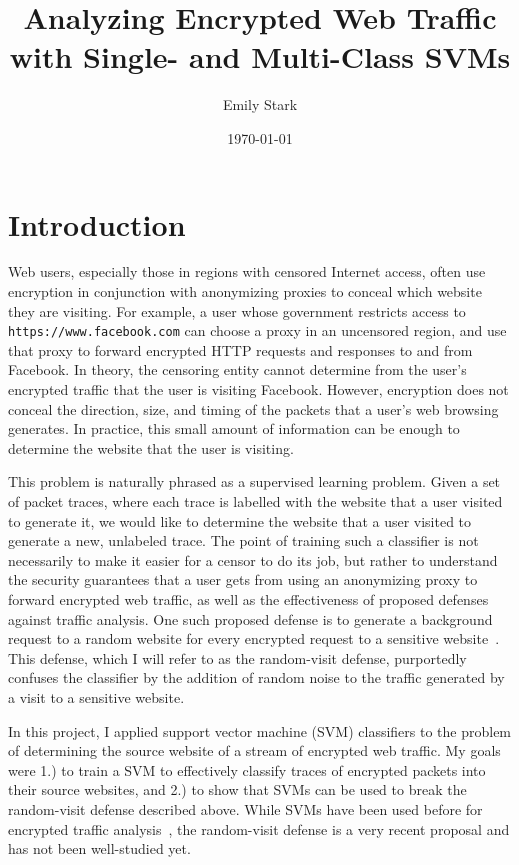 \documentclass[10pt, twocolumn]{article}
\title{Analyzing Encrypted Web Traffic with Single- and Multi-Class SVMs}
\author{Emily Stark}
\date{\today}                                          %
\begin{document}
\maketitle

\section{Introduction}
Web users, especially those in regions with censored 
Internet access, often use encryption in conjunction 
with anonymizing proxies to conceal which website 
they are visiting. For example, a user whose government 
restricts access to \texttt{https://www.facebook.com} can choose a 
proxy in an uncensored region, and use that proxy to 
forward encrypted HTTP requests and responses to and 
from Facebook. In theory, the censoring entity cannot determine from 
the user's encrypted traffic that the user is visiting 
Facebook. However, encryption does not conceal the direction, 
size, and timing of the packets that a user's web browsing 
generates. In practice, this small amount of information can 
be enough to determine the website that the user is visiting.

This problem is naturally phrased as a supervised learning 
problem. Given a set of packet traces, where each trace is labelled 
with the website that a user visited to generate it, we would 
like to determine the website that a user visited to generate a new, 
unlabeled trace. The point of training such a classifier is not 
necessarily to make it easier for a censor to do its job, but rather 
to understand the security guarantees that a user gets from using 
an anonymizing proxy to forward encrypted web traffic, as well as 
the effectiveness of proposed defenses against traffic analysis. 
One such proposed defense is to generate a background request to a 
random website for every encrypted request to a sensitive website~\cite{torfingerprinting}. 
This defense, which I will refer to as the random-visit defense, 
purportedly confuses the classifier by the addition of random 
noise to the traffic generated by a visit to a sensitive website.

In this project, I applied support vector machine (SVM) classifiers 
to the problem of determining the source website of a stream of 
encrypted web traffic. My goals were 1.) to train a SVM to 
effectively classify traces of encrypted packets into their source 
websites, and 2.) to show that SVMs can be used to break the random-visit 
defense described above. While SVMs have been used before for 
encrypted traffic analysis~\cite{SOMETHING}, the random-visit defense 
is a very recent proposal and has not been well-studied yet.
\end{document}
